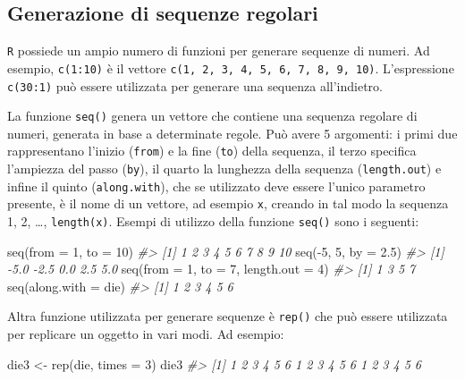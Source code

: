 \documentclass[
  11pt,
]{krantz}
\makeatletter
\newenvironment{Shaded}{\begin{snugshade}}{\end{snugshade}}
\newcommand{\AttributeTok}[1]{\textcolor[rgb]{0.61,0.61,0.61}{#1}}
\newcommand{\CommentTok}[1]{\textcolor[rgb]{0.37,0.37,0.37}{\textit{#1}}}
\newcommand{\DecValTok}[1]{\textcolor[rgb]{0.06,0.06,0.06}{#1}}
\newcommand{\FloatTok}[1]{\textcolor[rgb]{0.06,0.06,0.06}{#1}}
\newcommand{\FunctionTok}[1]{\textcolor[rgb]{0,0,0}{#1}}
\newcommand{\NormalTok}[1]{#1}
\newcommand{\OtherTok}[1]{\textcolor[rgb]{0.37,0.37,0.37}{#1}}
\newcommand{\SpecialCharTok}[1]{\textcolor[rgb]{0,0,0}{#1}}
\newenvironment{kframe}{%
\medskip{}
\setlength{\fboxsep}{.8em}
 \def\at@end@of@kframe{}%
 \ifinner\ifhmode%
  \def\at@end@of@kframe{\end{minipage}}%
  \begin{minipage}{\columnwidth}%
 \fi\fi%
 \def\FrameCommand##1{\hskip\@totalleftmargin \hskip-\fboxsep
 \colorbox{shadecolor}{##1}\hskip-\fboxsep
     \hskip-\linewidth \hskip-\@totalleftmargin \hskip\columnwidth}%
 \MakeFramed {\advance\hsize-\width
   \@totalleftmargin\z@ \linewidth\hsize
   \@setminipage}}%
 {\par\unskip\endMakeFramed%
 \at@end@of@kframe}
\renewenvironment{Shaded}{\begin{kframe}}{\end{kframe}}
\theoremstyle{definition}
\theoremstyle{definition}
\theoremstyle{definition}
\theoremstyle{definition}
\theoremstyle{remark}
\makeatother
\begin{document}
\hypertarget{generazione-di-sequenze-regolari}{%
\subsection{Generazione di sequenze regolari}\label{generazione-di-sequenze-regolari}}

\texttt{R} possiede un ampio numero di funzioni per generare sequenze di numeri. Ad esempio, \texttt{c(1:10)} è il vettore \texttt{c(1,\ 2,\ 3,\ 4,\ 5,\ 6,\ 7,\ 8,\ 9,\ 10)}. L'espressione \texttt{c(30:1)} può essere utilizzata per generare una sequenza all'indietro.

La funzione \texttt{seq()} genera un vettore che contiene una sequenza regolare di numeri, generata in base a determinate regole. Può avere 5 argomenti: i primi due rappresentano l'inizio (\texttt{from}) e la fine (\texttt{to}) della sequenza, il terzo specifica l'ampiezza del passo (\texttt{by}), il quarto la lunghezza della sequenza (\texttt{length.out}) e infine il quinto (\texttt{along.with}), che se utilizzato deve essere l'unico parametro presente, è il nome di un vettore, ad esempio \texttt{x}, creando in tal modo la sequenza 1, 2, \ldots, \texttt{length(x)}. Esempi di utilizzo della funzione \texttt{seq()} sono i seguenti:

\begin{Shaded}
\begin{Highlighting}[]
\FunctionTok{seq}\NormalTok{(}\AttributeTok{from =} \DecValTok{1}\NormalTok{, }\AttributeTok{to =} \DecValTok{10}\NormalTok{)}
\CommentTok{\#\textgreater{}  [1]  1  2  3  4  5  6  7  8  9 10}
\FunctionTok{seq}\NormalTok{(}\SpecialCharTok{{-}}\DecValTok{5}\NormalTok{, }\DecValTok{5}\NormalTok{, }\AttributeTok{by =} \FloatTok{2.5}\NormalTok{)}
\CommentTok{\#\textgreater{} [1] {-}5.0 {-}2.5  0.0  2.5  5.0}
\FunctionTok{seq}\NormalTok{(}\AttributeTok{from =} \DecValTok{1}\NormalTok{, }\AttributeTok{to =} \DecValTok{7}\NormalTok{, }\AttributeTok{length.out =} \DecValTok{4}\NormalTok{)}
\CommentTok{\#\textgreater{} [1] 1 3 5 7}
\FunctionTok{seq}\NormalTok{(}\AttributeTok{along.with =}\NormalTok{ die)}
\CommentTok{\#\textgreater{} [1] 1 2 3 4 5 6}
\end{Highlighting}
\end{Shaded}

Altra funzione utilizzata per generare sequenze è \texttt{rep()} che può essere utilizzata per replicare un oggetto in vari modi. Ad esempio:

\begin{Shaded}
\begin{Highlighting}[]
\NormalTok{die3 }\OtherTok{\textless{}{-}} \FunctionTok{rep}\NormalTok{(die, }\AttributeTok{times =} \DecValTok{3}\NormalTok{)}
\NormalTok{die3}
\CommentTok{\#\textgreater{}  [1] 1 2 3 4 5 6 1 2 3 4 5 6 1 2 3 4 5 6}
\end{Highlighting}
\end{Shaded}
\end{document}
